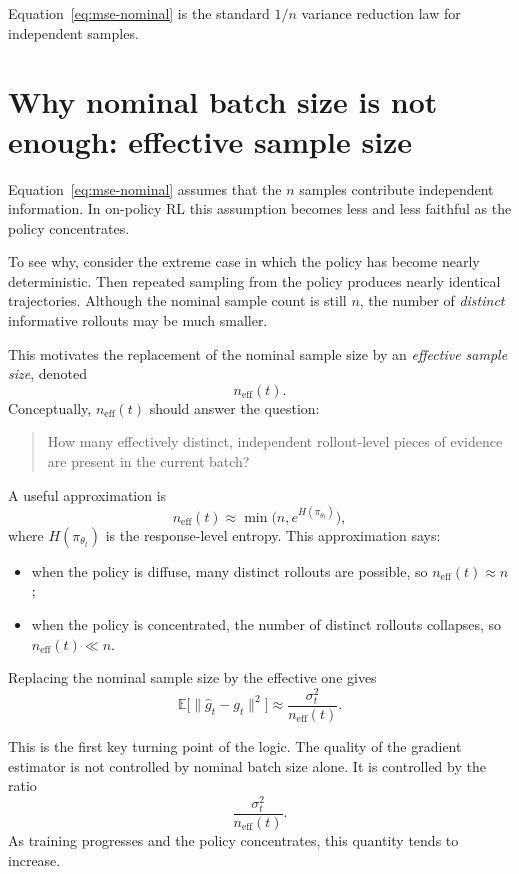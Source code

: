 \documentclass[11pt]{article}
\begin{document}
Equation~\eqref{eq:mse-nominal} is the standard $1/n$ variance reduction law for independent samples.

\section{Why nominal batch size is not enough: effective sample size}

Equation~\eqref{eq:mse-nominal} assumes that the $n$ samples contribute independent information. In on-policy RL this assumption becomes less and less faithful as the policy concentrates.

To see why, consider the extreme case in which the policy has become nearly deterministic. Then repeated sampling from the policy produces nearly identical trajectories. Although the nominal sample count is still $n$, the number of \emph{distinct} informative rollouts may be much smaller.

This motivates the replacement of the nominal sample size by an \emph{effective sample size}, denoted
\[
n_{\mathrm{eff}}(t).
\]
Conceptually, $n_{\mathrm{eff}}(t)$ should answer the question:
\begin{quote}
How many effectively distinct, independent rollout-level pieces of evidence are present in the current batch?
\end{quote}

A useful approximation is
\[
n_{\mathrm{eff}}(t)
\approx
\min\bigl(n, e^{H(\pi_{\theta_t})}\bigr),
\]
where $H(\pi_{\theta_t})$ is the response-level entropy. This approximation says:
\begin{itemize}
    \item when the policy is diffuse, many distinct rollouts are possible, so $n_{\mathrm{eff}}(t) \approx n$;
    \item when the policy is concentrated, the number of distinct rollouts collapses, so $n_{\mathrm{eff}}(t) \ll n$.
\end{itemize}

Replacing the nominal sample size by the effective one gives
\begin{equation}
\mathbb{E}\bigl[\|\hat g_t - g_t\|^2\bigr]
\approx
\frac{\sigma_t^2}{n_{\mathrm{eff}}(t)}.
\label{eq:mse-effective}
\end{equation}

This is the first key turning point of the logic. The quality of the gradient estimator is not controlled by nominal batch size alone. It is controlled by the ratio
\[
\frac{\sigma_t^2}{n_{\mathrm{eff}}(t)}.
\]
As training progresses and the policy concentrates, this quantity tends to increase.
\end{document}
